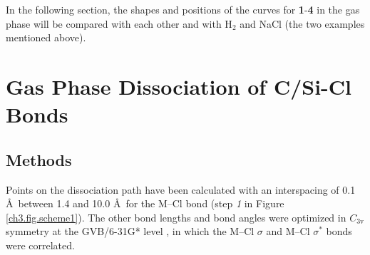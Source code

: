 In the following section, the shapes and positions of the curves for \textbf{1}-\textbf{4} in the gas phase will be compared with each other and with H$_2$ and NaCl (the two examples mentioned above).

\section{\label{ch3.sec.gasphase}Gas Phase Dissociation of C/Si-Cl Bonds}

\subsection{Methods}

Points on the dissociation path have been calculated with an interspacing of 0.1 \AA\ between 1.4 and 10.0 \AA\ for the \mbox{M--Cl} bond  (step \textit{1} in Figure \ref{ch3.fig.scheme1}). The other bond lengths and bond angles were optimized in $C_\mathrm{3v}$ symmetry at the \mbox{GVB/6-31G*} level \cite{gvb1,gvb2,gvb3,gvb4}, in which the \mbox{M--Cl} $\sigma$ and \mbox{M--Cl} $\sigma^{*}$ bonds were correlated.
